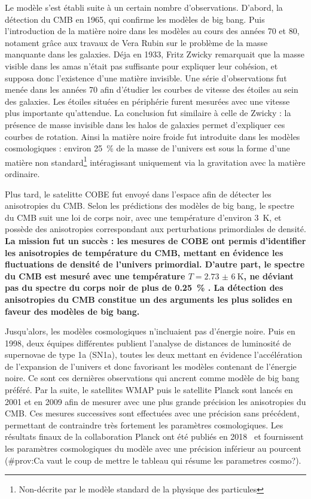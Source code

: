\documentclass[11pt, twoside, a4paper, openright]{report}
\begin{document}
Le modèle s'est établi suite à un certain nombre d'observations. D'abord, la détection du CMB en 1965, qui confirme les modèles de big bang.
Puis l'introduction de la matière noire dans les modèles au cours des années 70 et 80, notament grâce aux travaux de Vera Rubin sur le problème de la masse manquante dans les galaxies. Déja en 1933, Fritz Zwicky remarquait que la masse visible dans les amas n'était pas suffisante pour expliquer leur cohésion, et supposa donc l'existence d'une matière invisible. Une série d'observations fut menée dans les années 70 afin d'étudier les courbes de vitesse des étoiles au sein des galaxies. Les étoiles situées en périphérie furent mesurées avec une vitesse plus importante qu'attendue. La conclusion fut similaire à celle de Zwicky : la présence de masse invisible dans les halos de galaxies permet d'expliquer ces courbes de rotation. Ainsi la matière noire froide fut introduite dans les modèles cosmologiques : environ \SI{25}{\percent} de la masse de l'univers est sous la forme d'une matière non standard\footnote{Non-décrite par le modèle standard de la physique des particules} intéragissant uniquement via la gravitation avec la matière ordinaire.

Plus tard, le satelitte COBE fut envoyé dans l'espace afin de détecter les anisotropies du CMB. Selon les prédictions des modèles de big bang, le spectre du CMB suit une loi de corps noir, avec une température d'environ \SI{3}{\kelvin}, et possède des anisotropies correspondant aux perturbations primordiales de densité. \textbf{La mission fut un succès : les mesures de COBE ont permis d'identifier les anisotropies de température du CMB, mettant en évidence les fluctuations de densité de l'univers primordial. D'autre part, le spectre du CMB est mesuré avec une température $T = \SI{2,73(6)}{\kelvin}$, ne déviant pas du spectre du corps noir de plus de \SI{0,25}{\percent} \cite{CITE:https://www.ncbi.nlm.nih.gov/pmc/articles/PMC46596/}. La détection des anisotropies du CMB constitue un des arguments les plus solides en faveur des modèles de big bang.}

Jusqu'alors, les modèles cosmologiques n'incluaient pas d'énergie noire. Puis en 1998, deux équipes différentes publient l'analyse de distances de luminosité de supernovae de type 1a (SN1a), toutes les deux mettant en évidence l'accélération de l'expansion de l'univers et donc favorisant les modèles contenant de l'énergie noire. Ce sont ces dernières observations qui ancrent \lcdm{} comme modèle de big bang préféré. Par la suite, le satellites WMAP puis le satellite Planck sont lancés en 2001 et en 2009 afin de mesurer avec une plus grande précision les anisotropies du CMB. Ces mesures successives sont effectuées avec une précision sans précédent, permettant de contraindre très fortement les paramètres cosmologiques. Les résultats finaux de la collaboration Planck ont été publiés en 2018~\cite{CITE:planck2018} et fournissent les paramètres cosmologiques du modèle \lcdm{} avec une précision inférieur au pourcent (\#prov:Ca vaut le coup de mettre le tableau qui résume les parametres cosmo?).
\end{document}
